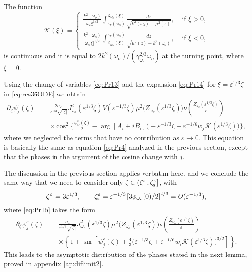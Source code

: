 \documentclass[final]{siamltex}
\begin{document}
The function 
\begin{equation} 
\mathcal{K}(\xi) = 
\left\{
\begin{array}{rr}
\displaystyle
\frac{k^2({\omega}_o)}{{\omega}_o \xi^{1/2}}
\int_{z_T({\omega}_o)}^{Z_{{\omega}_o}(\xi)} \frac{d z}{\sqrt{k^2({\omega}_o) -
    \mu^2(z)}}, & \mbox{ if $\xi >0$,} \\
\displaystyle
\frac{k^2({\omega}_o)}{{\omega}_o |\xi|^{1/2}}
\int_{Z_{{\omega}_o}(\xi)}^{z_T({\omega}_o)}  \frac{d z}{\sqrt{\mu^2(z)-k^2({\omega}_o) }}, & \mbox{ if $\xi<0$},
    \end{array}
    \right.
\end{equation}
is continuous and it is equal to $2 k^2({\omega}_o)/(
\gamma_{{\omega}_o}^{2/3}{\omega}_o)$ at the turning point, where $\xi = 0$.

Using the change of variables \eqref{eq:Pr13} and the expansion
\eqref{eq:Pr14} for $\xi = {\varepsilon}^{1/3} \zeta$ in \eqref{eq:res36ODE} we
obtain
\begin{align}
\partial_\zeta \psi_j^{\varepsilon}(\zeta) =& \frac{2 \sigma_{\varepsilon}}{{\varepsilon}^{1/3}
  \sqrt{|\zeta|}} J_{{\omega}_o}^2({\varepsilon}^{1/3} \zeta) V({\varepsilon}^{-1/3} \zeta)
\mu^2 \big(Z_{{\omega}_o}({\varepsilon}^{1/3} \zeta)\big) \nu \left(
\frac{Z_{{\omega}_o}({\varepsilon}^{1/3} \zeta)}{\varepsilon} \right) \nonumber \\ &\times
\cos^2 \Big\{ \frac{\psi_{\omega}^{\varepsilon}(\zeta)}{2} - \arg\left[A_i + i B_i
  \right]\big(-{\varepsilon}^{-1/3} \zeta - {\varepsilon}^{-1/6} w_j
\mathcal{K}({\varepsilon}^{1/3} \zeta))\Big\},
\label{eq:Pr15}
\end{align}
where we neglected the terms that have no contribution as ${\varepsilon} \to 0$. 
This equation  is basically the same as equation
\eqref{eq:Pr4} analyzed in the previous section, except that the
phases in the argument of the cosine change with $j$.

The discussion in the previous section applies verbatim here, and we
conclude the same way that we need to consider only $\zeta \in
(\zeta_{-}^{\varepsilon}, \zeta_{\rm s}^{\varepsilon}]$, with 
\[
\zeta_{-}^{\varepsilon} = 3 {\varepsilon}^{1/3}, \qquad \zeta_{\rm s}^{\varepsilon} = {\varepsilon}^{-1/3} \left[3
  \phi_{{\omega}_o}(0)/2\right]^{2/3} = O({\varepsilon}^{-1/3}),
\] 
where
\eqref{eq:Pr15} takes the form
\begin{align}
\partial_\zeta \psi_j^{\varepsilon}(\zeta) =& \frac{\sigma_{\varepsilon}}{{\varepsilon}^{1/3}
  \sqrt{|\zeta|}} J_{{\omega}_o}^2({\varepsilon}^{1/3} \zeta) \mu^2
\big(Z_{{\omega}_o}({\varepsilon}^{1/3} \zeta)\big) \nu \left(
\frac{Z_{{\omega}_o}({\varepsilon}^{1/3} \zeta)}{\varepsilon} \right) \nonumber \\ &\times
\left\{ 1 + \sin \left[ \psi_j^{\varepsilon}(\zeta) + \frac{4}{3}\big({\varepsilon}^{-1/3}
  \zeta + {\varepsilon}^{-1/6} w_j \mathcal{K}({\varepsilon}^{1/3}
  \zeta)\big)^{3/2}\right]\right\}.
\label{eq:Pr16}
\end{align}
This leads to the asymptotic distribution of the phases stated in the next lemma,
proved in  appendix \ref{ap:diflimit2}.
\end{document}
